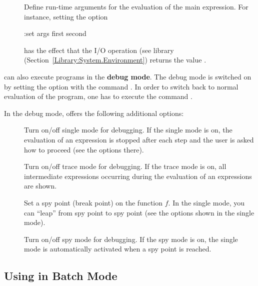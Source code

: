 \begin{description}
\item[]
Define run-time arguments for the evaluation
of the main expression.
For instance, setting the option
\begin{curry}
:set args first second
\end{curry}
has the effect that the I/O operation 
(see library 
(Section~\ref{Library:System.Environment})
returns the value .

\end{description}
%
\bigskip
%
\CYS can also execute programs in the {\bf debug mode}.
The debug mode is switched on by setting the  option
with the command . In order to switch
back to normal evaluation of the program, one has to execute
the command .

In the debug mode, \CYS offers the following additional options:
%
\begin{description}
\item[]
Turn on/off single mode for debugging.
If the single mode is on, the evaluation of an expression
is stopped after each step and the user is asked how to proceed
(see the options there).

\item[]
Turn on/off trace mode for debugging.
If the trace mode is on, all intermediate expressions occurring
during the evaluation of an expressions are shown.

\item[]
Set a spy point (break point) on the
function $f$. In the single mode, you can ``leap'' from spy point
to spy point (see the options shown in the single mode).

\item[] Turn on/off spy mode for debugging.
If the spy mode is on, the single mode is automatically activated
when a spy point is reached.
\end{description}


\subsection{Using \CYS in Batch Mode}

